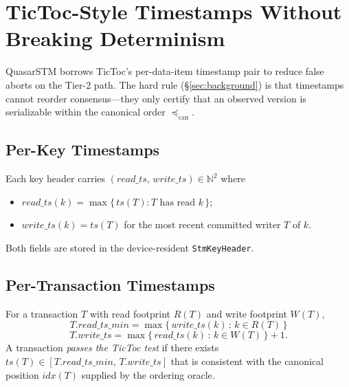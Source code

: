 \section{TicToc-Style Timestamps Without Breaking Determinism}

\label{sec:tictoc}

QuasarSTM borrows TicToc's per-data-item timestamp pair to reduce
false aborts on the Tier-2 path. The hard rule
(\S\ref{sec:background}) is that timestamps cannot reorder
consensus---they only certify that an observed version is
serializable within the canonical order $\preceq_{\mathrm{can}}$.

\subsection{Per-Key Timestamps}

\begin{definition}
\label{def:per-key-ts}
Each key header carries
$(\mathit{read\_ts},\, \mathit{write\_ts}) \in \mathbb{N}^2$ where
\begin{itemize}[leftmargin=2em,nosep]
\item $\mathit{read\_ts}(k) = \max \{\, \mathit{ts}(T) :
      T \text{ has read } k \,\}$;
\item $\mathit{write\_ts}(k) = \mathit{ts}(T)$ for the most recent
      committed writer $T$ of $k$.
\end{itemize}
Both fields are stored in the device-resident
\texttt{StmKeyHeader}.
\end{definition}

\subsection{Per-Transaction Timestamps}

\begin{definition}
\label{def:per-tx-ts}
For a transaction $T$ with read footprint $R(T)$ and write footprint
$W(T)$,
\[
T.\mathit{read\_ts\_min} =
\max \bigl\{\, \mathit{write\_ts}(k) \,:\, k \in R(T) \,\bigr\}
\]
\[
T.\mathit{write\_ts} =
\max \bigl\{\, \mathit{read\_ts}(k) \,:\, k \in W(T) \,\bigr\} + 1.
\]
A transaction \emph{passes the TicToc test} if there exists
$\mathit{ts}(T) \in [T.\mathit{read\_ts\_min},\, T.\mathit{write\_ts}]$
that is consistent with the canonical position
$\mathit{idx}(T)$ supplied by the ordering oracle.
\end{definition}

